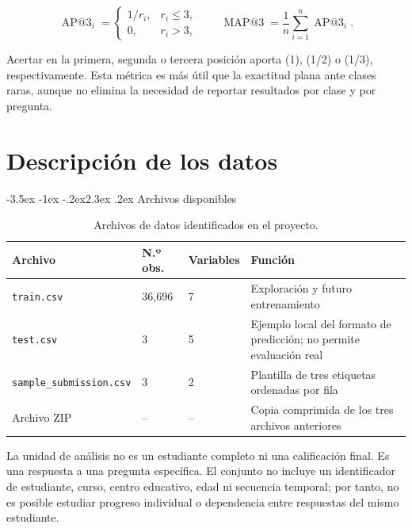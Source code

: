 \documentclass[11pt,oneside,openany]{book}
\makeatletter
\renewcommand\section{\@startsection{section}{1}{\z@}%
  {-3.5ex \@plus -1ex \@minus -.2ex}{2.3ex \@plus .2ex}%
  {\normalfont\Large\sffamily\bfseries\color{AzulMedio}}}
\newcommand{\codigo}[1]{\texttt{#1}}
\makeatother
\begin{document}
\begin{equation}
\operatorname{AP@3}_i =
\begin{cases}
1/r_i, & r_i \leq 3,\\
0, & r_i > 3,
\end{cases}
\qquad
\operatorname{MAP@3}=\frac{1}{n}\sum_{i=1}^{n}\operatorname{AP@3}_i.
\end{equation}

Acertar en la primera, segunda o tercera posición aporta (1), (1/2) o
(1/3), respectivamente. Esta métrica es más útil que la exactitud plana ante
clases raras, aunque no elimina la necesidad de reportar resultados por clase
y por pregunta.

\chapter{Descripción de los datos}

\section{Archivos disponibles}

\begin{table}[htbp]
\centering
\small
\caption{Archivos de datos identificados en el proyecto.}
\label{tab:archivos}
\begin{tabularx}{\textwidth}{@{}p{3.7cm}R{2.5cm}R{2.4cm}Y@{}}
\toprule
\textbf{Archivo} & \textbf{N.º obs.} & \textbf{Variables} &
\textbf{Función}\\
\midrule
\codigo{train.csv} & 36,696 & 7 & Exploración y futuro entrenamiento\\
\codigo{test.csv} & 3 & 5 & Ejemplo local del formato de predicción; no permite evaluación real\\
\codigo{sample\_}\linebreak\codigo{submission.csv} & 3 & 2 & Plantilla de tres etiquetas ordenadas por fila\\
Archivo ZIP & -- & -- & Copia comprimida de los tres archivos anteriores\\
\bottomrule
\end{tabularx}
\end{table}

La unidad de análisis no es un estudiante completo ni una calificación final.
Es una respuesta a una pregunta específica. El conjunto no incluye un
identificador de estudiante, curso, centro educativo, edad ni secuencia
temporal; por tanto, no es posible estudiar progreso individual o dependencia
entre respuestas del mismo estudiante.
\end{document}
